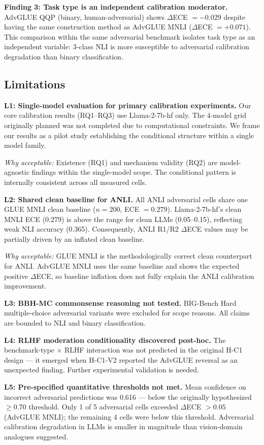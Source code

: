 \textbf{Finding 3: Task type is an independent calibration moderator.} AdvGLUE QQP (binary, human-adversarial) shows $\Delta$ECE $= -0.029$ despite having the same construction method as AdvGLUE MNLI ($\Delta$ECE $= +0.071$). This comparison within the same adversarial benchmark isolates task type as an independent variable: 3-class NLI is more susceptible to adversarial calibration degradation than binary classification.

\subsection{Limitations}

\textbf{L1: Single-model evaluation for primary calibration experiments.} Our core calibration results (RQ1--RQ3) use Llama-2-7b-hf only. The 4-model grid originally planned was not completed due to computational constraints. We frame our results as a pilot study establishing the conditional structure within a single model family.

\textit{Why acceptable:} Existence (RQ1) and mechanism validity (RQ2) are model-agnostic findings within the single-model scope. The conditional pattern is internally consistent across all measured cells.

\textbf{L2: Shared clean baseline for ANLI.} All ANLI adversarial cells share one GLUE MNLI clean baseline ($n=200$, ECE $= 0.279$). Llama-2-7b-hf's clean MNLI ECE (0.279) is above the \citet{kadavath2022language} range for clean LLMs (0.05--0.15), reflecting weak NLI accuracy (0.365). Consequently, ANLI R1/R2 $\Delta$ECE values may be partially driven by an inflated clean baseline.

\textit{Why acceptable:} GLUE MNLI is the methodologically correct clean counterpart for ANLI. AdvGLUE MNLI uses the same baseline and shows the expected positive $\Delta$ECE, so baseline inflation does not fully explain the ANLI calibration improvement.

\textbf{L3: BBH-MC commonsense reasoning not tested.} BIG-Bench Hard multiple-choice adversarial variants were excluded for scope reasons. All claims are bounded to NLI and binary classification.

\textbf{L4: RLHF moderation conditionality discovered post-hoc.} The benchmark-type $\times$ RLHF interaction was not predicted in the original H-C1 design --- it emerged when H-C1-V2 reported the AdvGLUE reversal as an unexpected finding. Further experimental validation is needed.

\textbf{L5: Pre-specified quantitative thresholds not met.} Mean confidence on incorrect adversarial predictions was 0.616 --- below the originally hypothesized $\geq$0.70 threshold. Only 1 of 5 adversarial cells exceeded $\Delta$ECE $> 0.05$ (AdvGLUE MNLI); the remaining 4 cells were below this threshold. Adversarial calibration degradation in LLMs is smaller in magnitude than vision-domain analogues suggested.

